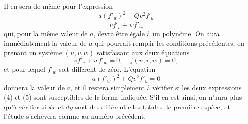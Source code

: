 \documentclass{article}
\begin{document}
Il en sera de même pour l'expression
\[
\frac{a (f'_{w})^{2} + Q v^{2} f'_{u}}{v f'_{v} + w f'_{w}} \tag{5}
\]
qui, pour la même valeur de $a$, devra être égale à un polynôme. On aura immédiatement la valeur de $a$ qui pourrait remplir les conditions précédentes, en prenant un système $(u, v, w)$ satisfaisant aux deux équations
\[
v f'_{v} + w f'_{w} = 0, \quad f(u, v, w) = 0,
\]
et pour lequel $f'_{w}$ soit différent de zéro. L'équation
\[
a (f'_{w})^{2} + Q v^{2} f'_{u} = 0
\]
donnera la valeur de $a$, et il restera simplement à vérifier si les deux expressions (4) et (5) sont susceptibles de la forme indiquée. S'il en est ainsi, on n'aura plus qu'à vérifier si $dx$ et $dy$ sont des différentielles totales de première espèce, et l'étude s'achèvera comme au numéro précédent.
\end{document}
